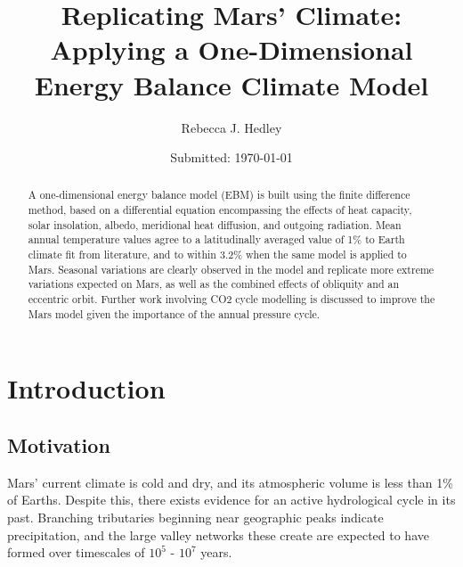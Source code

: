 \documentclass[12pt,onecolumn]{revtex4-2}    %
\begin{document}
\title{Replicating Mars' Climate: Applying a One-Dimensional Energy Balance Climate Model} 
\date{Submitted: \today{}}
\author{Rebecca J. Hedley}


\begin{abstract}              

A one-dimensional energy balance model (EBM) is built using the finite difference method, based on a differential equation encompassing the effects of heat capacity, solar insolation, albedo, meridional heat diffusion, and outgoing radiation. Mean annual temperature values agree to a latitudinally averaged value of 1\% to Earth climate fit from literature, and to within 3.2\% when the same model is applied to Mars. Seasonal variations are clearly observed in the model and replicate more extreme variations expected on Mars, as well as the combined effects of obliquity and an eccentric orbit. Further work involving CO2 cycle modelling is discussed to improve the Mars model given the importance of the annual pressure cycle.

\end{abstract}

\maketitle

\thispagestyle{plain} %

\tableofcontents

\section{Introduction} 

\subsection{Motivation}

Mars' current climate is cold and dry, and its atmospheric volume is less than 1\% of Earths. Despite this, there exists evidence for an active hydrological cycle in its past. Branching tributaries beginning near geographic peaks indicate precipitation, and the large valley networks these create are expected to have formed over timescales of $10^{5}$ - $10^{7}$ years. \cite{W16} %
\end{document}
